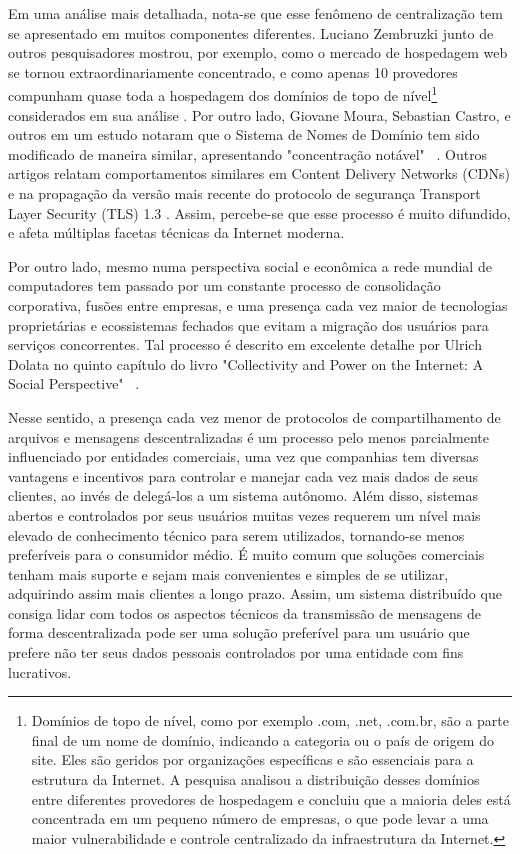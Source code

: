 Em uma análise mais detalhada, nota-se que esse fenômeno de centralização tem se apresentado em muitos componentes diferentes. Luciano Zembruzki junto de outros pesquisadores mostrou, por exemplo, como o mercado de hospedagem web se tornou extraordinariamente concentrado, e como apenas 10 provedores compunham quase toda a hospedagem dos domínios de topo de nível\footnote{Domínios de topo de nível, como por exemplo .com, .net, .com.br, são a parte final de um nome de domínio, indicando a categoria ou o país de origem do site. Eles são geridos por organizações específicas e são essenciais para a estrutura da Internet. A pesquisa analisou a distribuição desses domínios entre diferentes provedores de hospedagem e concluiu que a maioria deles está concentrada em um pequeno número de empresas, o que pode levar a uma maior vulnerabilidade e controle centralizado da infraestrutura da Internet.}  considerados em sua análise \cite{Zembruzki2022}. Por outro lado, Giovane Moura, Sebastian Castro, e outros em um estudo notaram que o Sistema de Nomes de Domínio tem sido modificado de maneira similar, apresentando "concentração notável" ~\cite{Moura2020}. Outros artigos relatam comportamentos similares em Content Delivery Networks (CDNs) e na propagação da versão mais recente do protocolo de segurança Transport Layer Security (TLS) 1.3 \cite{Vermeulen2023, Holz2020}. Assim, percebe-se que esse processo é muito difundido, e afeta múltiplas facetas técnicas da Internet moderna.

Por outro lado, mesmo numa perspectiva social e econômica a rede mundial de computadores tem passado por um constante processo de consolidação corporativa, fusões entre empresas, e uma presença cada vez maior de tecnologias proprietárias e ecossistemas fechados que evitam a migração dos usuários para serviços concorrentes. Tal processo é descrito em excelente detalhe por Ulrich Dolata no quinto capítulo do livro "Collectivity and Power on the Internet: A Social Perspective" ~\cite{UlrichDolata}.

Nesse sentido, a presença cada vez menor de protocolos de compartilhamento de arquivos e mensagens descentralizadas é um processo pelo menos parcialmente influenciado por entidades comerciais, uma vez que companhias tem diversas vantagens e incentivos para controlar e manejar cada vez mais dados de seus clientes, ao invés de delegá-los a um sistema autônomo. Além disso, sistemas abertos e controlados por seus usuários muitas vezes requerem um nível mais elevado de conhecimento técnico para serem utilizados, tornando-se menos preferíveis para o consumidor médio. É muito comum que soluções comerciais tenham mais suporte e sejam mais convenientes e simples de se utilizar, adquirindo assim mais clientes a longo prazo. Assim, um sistema distribuído que consiga lidar com todos os aspectos técnicos da transmissão de mensagens de forma descentralizada pode ser uma solução preferível para um usuário que prefere não ter seus dados pessoais controlados por uma entidade com fins lucrativos. 

